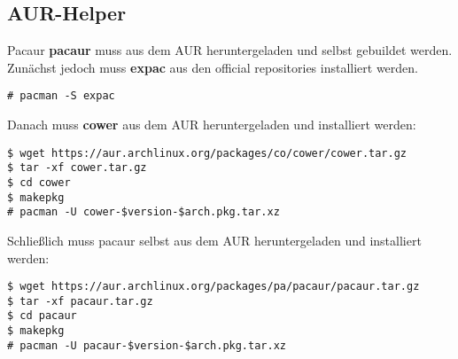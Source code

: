 \subsection{AUR-Helper}
Pacaur \textbf{pacaur} muss aus dem AUR heruntergeladen und selbst gebuildet werden.
Zunächst jedoch muss \textbf{expac} aus den official repositories installiert werden.
\begin{lstlisting}[style=Bash]
# pacman -S expac
\end{lstlisting}
Danach muss \textbf{cower} aus dem AUR heruntergeladen und installiert werden:
\begin{lstlisting}[style=Bash]
$ wget https://aur.archlinux.org/packages/co/cower/cower.tar.gz
$ tar -xf cower.tar.gz
$ cd cower
$ makepkg
# pacman -U cower-$version-$arch.pkg.tar.xz
\end{lstlisting}
Schließlich muss pacaur selbst aus dem AUR heruntergeladen und installiert werden:
\begin{lstlisting}[style=Bash]
$ wget https://aur.archlinux.org/packages/pa/pacaur/pacaur.tar.gz
$ tar -xf pacaur.tar.gz
$ cd pacaur
$ makepkg
# pacman -U pacaur-$version-$arch.pkg.tar.xz
\end{lstlisting}
